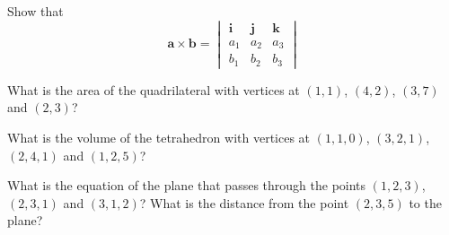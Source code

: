 {%
\begin{Exercise}
\label{exercise matrix form of cross product}
Show that
\[
\mathbf{a} \times \mathbf{b} =
\begin{vmatrix}
\mathbf{i} & \mathbf{j} & \mathbf{k} \\
a_1 & a_2 & a_3 \\
b_1 & b_2 & b_3
\end{vmatrix}
\]

\end{Exercise}




\begin{Exercise}
\label{exercise area quadrilateral 11 42 37 23}
What is the area of the quadrilateral with vertices at $(1,1)$, $(4,2)$,
$(3,7)$ and $(2,3)$?

\end{Exercise}



\begin{Exercise}
\label{exercise volume tetrahedron 110 321 241 125}
What is the volume of the tetrahedron with vertices at $(1,1,0)$, $(3,2,1)$,
$(2,4,1)$ and $(1,2,5)$?

\end{Exercise}




\begin{Exercise}
\label{exercise equation of plane 123 231 312}
What is the equation of the plane that passes through the points
$(1,2,3)$, $(2,3,1)$ and $(3,1,2)$?  What is the distance from the point
$(2,3,5)$ to the plane?

\end{Exercise}













\raggedbottom
}
